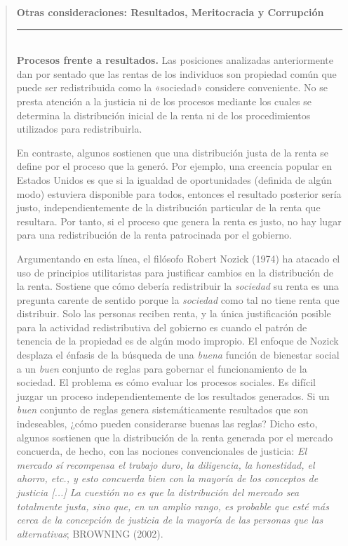 \documentclass[10pt,a4paper]{article}
\newenvironment{specialblock}[1]{%
      \begin{quote} %
      \small %
      \noindent\textbf{#1}\\[-0.3em] %
      \rule{\linewidth}{0.4pt}\\[0.6em]}{
      \end{quote}}
\begin{document}
\begin{specialblock}{\textbf{Otras consideraciones:} Resultados, Meritocracia y Corrupción}
    \textbf{Procesos frente a resultados.} Las posiciones analizadas anteriormente dan por sentado que las rentas de los individuos son propiedad común que puede ser redistribuida como la «sociedad» considere conveniente. No se presta atención a la justicia ni de los procesos mediante los cuales se determina la distribución inicial de la renta ni de los procedimientos utilizados para redistribuirla.

    En contraste, algunos sostienen que una distribución justa de la renta se define por el proceso que la generó. Por ejemplo, una creencia popular en Estados Unidos es que si la igualdad de oportunidades (definida de algún modo) estuviera disponible para todos, entonces el resultado posterior sería justo, independientemente de la distribución particular de la renta que resultara. Por tanto, si el proceso que genera la renta es justo, no hay lugar para una redistribución de la renta patrocinada por el gobierno.
    
    Argumentando en esta línea, el filósofo Robert Nozick (1974) ha atacado el uso de principios utilitaristas para justificar cambios en la distribución de la renta. Sostiene que cómo debería redistribuir la \textit{sociedad} su renta es una pregunta carente de sentido porque la \textit{sociedad} como tal no tiene renta que distribuir. Solo las personas reciben renta, y la única justificación posible para la actividad redistributiva del gobierno es cuando el patrón de tenencia de la propiedad es de algún modo impropio. El enfoque de Nozick desplaza el énfasis de la búsqueda de una \textit{buena} función de bienestar social a un \textit{buen} conjunto de reglas para gobernar el funcionamiento de la sociedad. El problema es cómo evaluar los procesos sociales. Es difícil juzgar un proceso independientemente de los resultados generados. Si un \textit{buen} conjunto de reglas genera sistemáticamente resultados que son indeseables, ¿cómo pueden considerarse buenas las reglas? Dicho esto, algunos sostienen que la distribución de la renta generada por el mercado concuerda, de hecho, con las nociones convencionales de justicia: \textit{El mercado sí recompensa el trabajo duro, la diligencia, la honestidad, el ahorro, etc., y esto concuerda bien con la mayoría de los conceptos de justicia [...] La cuestión no es que la distribución del mercado sea totalmente justa, sino que, en un amplio rango, es probable que esté más cerca de la concepción de justicia de la mayoría de las personas que las alternativas}; BROWNING (2002).


\end{specialblock}
\end{document}
